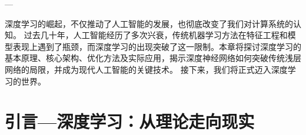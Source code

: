 %
%
\begin{flushright}
---
\end{flushright}
深度学习的崛起，不仅推动了人工智能的发展，也彻底改变了我们对计算系统的认知。
过去几十年，人工智能经历了多次兴衰，传统机器学习方法在特征工程和模型表现上遇到了瓶颈，而深度学习的出现突破了这一限制。本章将探讨深度学习的基本原理、核心架构、优化方法及实际应用，揭示深度神经网络如何突破传统浅层网络的局限，并成为现代人工智能的关键技术。
接下来，我们将正式迈入深度学习的世界。
\section{引言---深度学习：从理论走向现实}


